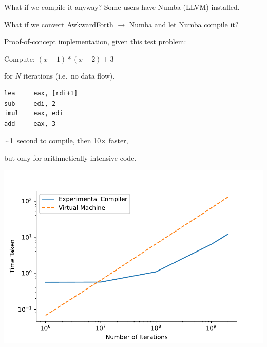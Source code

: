 \documentclass[aspectratio=169]{beamer}
\begin{document}
\begin{frame}[fragile]{What if we compile it anyway?}
\vspace{0.5 cm}
Some users have Numba (LLVM) installed.

\vspace{0.25 cm}
What if we convert AwkwardForth $\to$ Numba and let Numba compile it?

\vspace{0.5 cm}
Proof-of-concept implementation, given this test problem:

\vspace{0.25 cm}
Compute: $(x + 1) * (x - 2) + 3$

for $N$ iterations (i.e.\ no data flow).

\vspace{0.25 cm}

\vspace{0.25 cm}
\scriptsize
\begin{verbatim}
lea     eax, [rdi+1]
sub     edi, 2
imul    eax, edi
add     eax, 3
\end{verbatim}

\normalsize
\vspace{0.5 cm}
$\sim$1~second to compile, then 10$\times$ faster,

but only for arithmetically intensive code.

\vspace{-5.5 cm}
\hfill \includegraphics[width=0.6\linewidth]{PLOTS/new_compiler.pdf} \mbox{\hspace{-1 cm}}

\end{frame}
\end{document}
